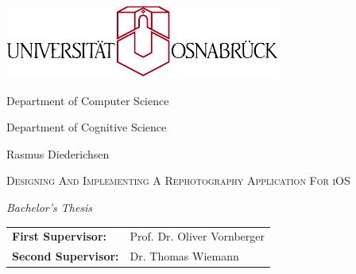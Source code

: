 \documentclass[
   pdftex,
   fontsize=11pt,
   a4paper
]{scrbook}
\begin{document}
\begin{titlepage}
   \thispagestyle{empty}
   \vspace*{1cm}

   \begin{center}

      \Large

      \includegraphics[width=.5\textwidth]{../gfx/uni.pdf}

      \vspace{2cm}

      Department of Computer Science

      Department of Cognitive Science

      \vspace{2cm}

      {
         \LARGE
         Rasmus Diederichsen
      }

      \vspace{2cm}

      {
         \Huge \scshape
         Designing And Implementing A Rephotography Application For iOS
         \par
      }

      \vspace{2cm}

      {
         \LARGE \emph{Bachelor's Thesis}
      }

      \vspace{3cm}

      {
         \begin{tabular}{>{\bfseries}ll}
            First Supervisor: & Prof. Dr. Oliver Vornberger \\
            Second Supervisor: & Dr. Thomas Wiemann
         \end{tabular}
      }

   \end{center}
\end{titlepage}
\end{document}
